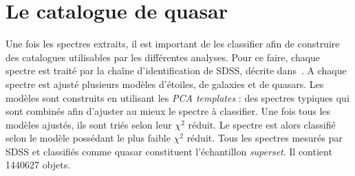 \documentclass[11pt, twoside, a4paper, openright]{report}
\begin{document}
\section{Le catalogue de quasar}
Une fois les spectres extraits, il est important de les classifier afin de construire des catalogues utilisables par les différentes analyses. Pour ce faire, chaque spectre est traité par la chaîne d'identification de SDSS, décrite dans~\cite{Bolton2012}. A chaque spectre est ajusté plusieurs modèles d'étoiles, de galaxies et de quasars. Les modèles sont construits en utilisant les \emph{PCA templates} : des spectres typiques qui sont combinés afin d'ajuster au mieux le spectre à classifier. Une fois tous les modèles ajustés, ils sont triés selon leur $\chi^{2}$ réduit. Le spectre est alors classifié selon le modèle possédant le plus faible $\chi^{2}$ réduit.
Tous les spectres mesurés par SDSS et classifiés comme quasar constituent l'échantillon \emph{superset}. Il contient \num{1440627} objets.
\end{document}
